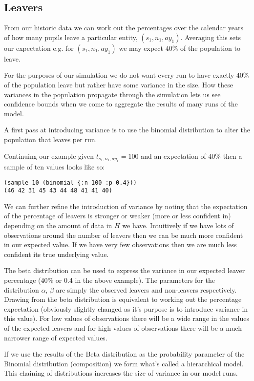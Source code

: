\documentclass[margin=5mm]{article}
\begin{document}
\subsection{Leavers}

From our historic data we can work out the percentages over the
calendar years of how many pupils leave a particular entity,
$(s_1,n_1,ay_1)$.  Averaging this sets our expectation e.g. for
$(s_1,n_1,ay_1)$ we may expect $40\%$ of the population to leave.

For the purposes of our simulation we do not want every run to have
exactly $40\%$ of the population leave but rather have some variance
in the size.  How these variances in the population propagate through
the simulation lets us see confidence bounds when we come to
aggregate the results of many runs of the model.

A first pass at introducing variance is to use the binomial
distribution to alter the population that leaves per run.

Continuing our example given $t_{s_1,n_1,ay_1} = 100$ and an
expectation of $40\%$ then a sample of ten values looks like so:

\begin{lstlisting}
(sample 10 (binomial {:n 100 :p 0.4}))
(46 42 31 45 43 44 48 41 41 40)
\end{lstlisting}

We can further refine the introduction of variance by noting that the
expectation of the percentage of leavers is stronger or weaker (more
or less confident in) depending on the amount of data in $H$ we have.
Intuitively if we have lots of observations around the number of
leavers then we can be much more confident in our expected value.  If
we have very few observations then we are much less confident its true
underlying value.

The beta distribution can be used to express the variance in our
expected leaver percentage (40\% or 0.4 in the above example).  The
parameters for the distribution $\alpha$, $\beta$ are simply the
observed leavers and non-leavers respectively.  Drawing from the beta
distribution is equivalent to working out the percentage expectation
(obviously slightly changed as it's purpose is to introduce variance
in this value).  For low values of observations there will be a wide
range in the values of the expected leavers and for high values of
observations there will be a much narrower range of expected values.

If we use the results of the Beta distribution as the probability
parameter of the Binomial distribution (composition) we form what's
called a hierarchical model.  This chaining of distributions increases
the size of variance in our model runs.
\end{document}
